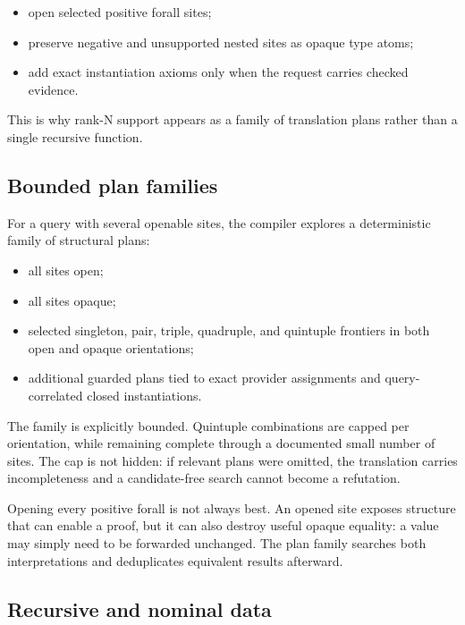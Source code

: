 \documentclass[10pt,letterpaper,oneside]{report}
\begin{document}
\begin{itemize}
  \item open selected positive forall sites;
  \item preserve negative and unsupported nested sites as opaque type atoms;
  \item add exact instantiation axioms only when the request carries checked evidence.
\end{itemize}

This is why rank-N support appears as a family of translation plans rather than a single recursive function.

\subsection{Bounded plan families}

For a query with several openable sites, the compiler explores a deterministic family of structural plans:

\begin{itemize}
  \item all sites open;
  \item all sites opaque;
  \item selected singleton, pair, triple, quadruple, and quintuple frontiers in both open and opaque orientations;
  \item additional guarded plans tied to exact provider assignments and query-correlated closed instantiations.
\end{itemize}

The family is explicitly bounded. Quintuple combinations are capped per orientation, while remaining complete through a documented small number of sites. The cap is not hidden: if relevant plans were omitted, the translation carries incompleteness and a candidate-free search cannot become a refutation.

\begin{designbox}
Opening every positive forall is not always best. An opened site exposes structure that can enable a proof, but it can also destroy useful opaque equality: a value may simply need to be forwarded unchanged. The plan family searches both interpretations and deduplicates equivalent results afterward.
\end{designbox}

\subsection{Recursive and nominal data}
\end{document}
